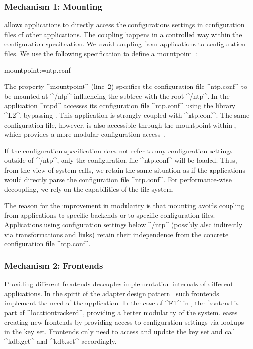 \subsubsection{Mechanism 1: Mounting}

 allows applications to directly access the configurations settings in configuration files of other applications.
The coupling happens in a controlled way within the configuration specification.
We avoid coupling from applications to configuration files.
We use the following specification to define a mountpoint~\cite{raab2016improving}:

\begin{code}
[ntp]
  mountpoint:=ntp.conf
\end{code}

The property ^mountpoint^ (line~2) specifies the configuration file ^ntp.conf^ to be mounted at ^/ntp^ influencing the subtree with the root ^/ntp^.
In  the application ^ntpd^ accesses its configuration file ^ntp.conf^ using the library ^L2^, bypassing .
This application is strongly coupled with ^ntp.conf^.
The same configuration file, however, is also accessible through the mountpoint within , which provides a more modular configuration access~\cite{raab2016improving}.

If the configuration specification does not refer to any configuration settings outside of ^/ntp^, only the configuration file ^ntp.conf^ will be loaded.
Thus, from the view of system calls, we retain the same situation as if the applications would directly parse the configuration file ^ntp.conf^.
For performance-wise decoupling, we rely on the capabilities of the file system.

The reason for the improvement in modularity is that mounting avoids coupling from applications to specific backends or to specific configuration files.
Applications using configuration settings below ^/ntp^ (possibly also indirectly via transformations and links) retain their independence from the concrete configuration file ^ntp.conf^.


\subsubsection{Mechanism 2: Frontends}

Providing different frontends decouples implementation internals of different applications.
In the spirit of the adapter design pattern~\cite{gamma1994design} such frontends implement the need of the application.
In the case of ^F1^ in , the frontend is part of ^locationtrackerd^, providing a better modularity of the system.
\elektra{} eases creating new frontends by providing access to configuration settings via lookups in the key set.
Frontends only need to access and update the key set and call ^kdb.get^ and ^kdb.set^ accordingly.

